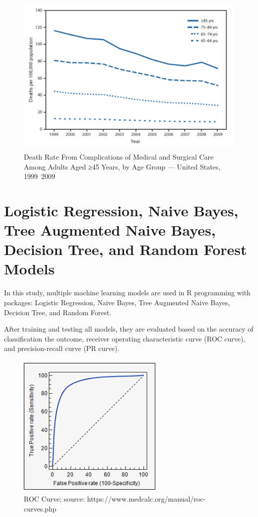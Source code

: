 \documentclass[twoside,11pt]{article}
\begin{document}
\begin{figure}[htbp]
  \centering 
  \includegraphics[height=8cm, width=12cm]{fig1} 
  \caption{Death Rate From Complications of Medical and Surgical Care Among Adults Aged ≥45 Years, by Age Group — United States, 1999~2009}
  \label{fig1} 
\end{figure} 

\section{Logistic Regression, Naive Bayes, Tree Augmented Naive Bayes, Decision Tree, and Random Forest Models} \label{model}
In this study, multiple machine learning models are used in R programming with packages: Logistic Regression, Naive Bayes, Tree Augmented Naive Bayes, Decision Tree, and Random Forest.

After training and testing all models, they are evaluated based on the accuracy of classification the outcome, receiver operating characteristic curve (ROC curve), and precision-recall curve (PR curve).

\begin{figure}[htbp]
  \centering 
  \includegraphics[height=7cm, width=7cm]{fig2} 
  \caption{ROC Curve; source: https://www.medcalc.org/manual/roc-curves.php}
  \label{fig2} 
\end{figure} 
\end{document}
